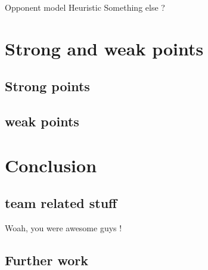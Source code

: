 Opponent model Heuristic
Something else ?


\section{Strong and weak points}

\subsection{Strong points}

\subsection{weak points}


\section{Conclusion}

\subsection{team related stuff}
Woah, you were awesome guys !

\subsection{Further work}